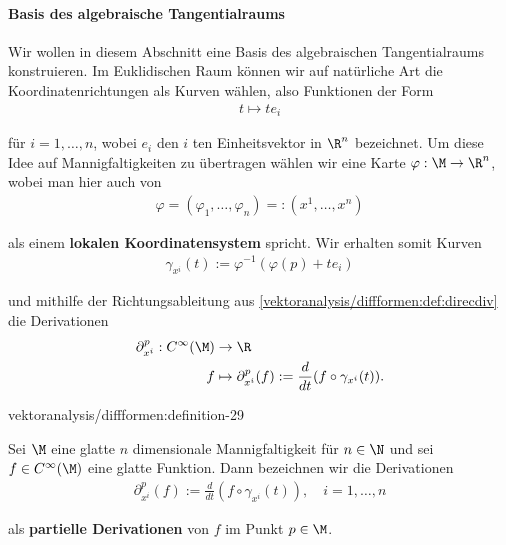 \documentclass[letterpaper,10pt,english]{jupyterBook}
\begin{document}
\paragraph{Basis des algebraische Tangentialraums}
\label{\detokenize{vektoranalysis/diffformen:basis-des-algebraische-tangentialraums}}\label{\detokenize{vektoranalysis/diffformen:sec-tpbasis}}
\par
Wir wollen in diesem Abschnitt eine Basis des algebraischen Tangentialraums konstruieren.
Im Euklidischen Raum können wir auf natürliche Art die Koordinatenrichtungen als Kurven wählen, also Funktionen der Form
\begin{align*}
t \mapsto t e_i
\end{align*}
\par
für \(i=1,\ldots,n\), wobei \(e_i\) den \(i\) ten Einheitsvektor in \(\R^n\) bezeichnet.
Um diese Idee auf Mannigfaltigkeiten zu übertragen wählen wir eine Karte \(\varphi:\M\to\R^n\), wobei man hier auch von
\begin{align*}
\varphi = (\varphi_1,\ldots,\varphi_n) =: (x^1,\ldots,x^n)
\end{align*}
\par
als einem \textbf{lokalen Koordinatensystem} spricht.
Wir erhalten somit Kurven
\begin{align*}
\gamma_{x^i}(t):= \varphi^{-1}(\varphi(p) + t e_i)
\end{align*}
\par
und mithilfe der Richtungsableitung aus \cref{vektoranalysis/diffformen:def:direcdiv} die Derivationen
\begin{align*}
\partial_{x^i}^p: C^\infty(\M) &\to \R\\
f &\mapsto \partial_{x^i}^p(f) := \frac{d}{dt} (f\circ \gamma_{x^i}(t)).
\end{align*}\begin{definition}{}{vektoranalysis/diffformen:definition-29}



\par
Sei \(\M\) eine glatte \(n\) dimensionale Mannigfaltigkeit für \(n\in\N\) und sei \(f \in C^\infty(\M)\) eine glatte Funktion.
Dann bezeichnen wir die Derivationen
\begin{align*}
\partial_{x^i}^p (f) := \frac{d}{dt} (f\circ \gamma_{x^i}(t)), \quad i=1,\ldots,n
\end{align*}
\par
als \textbf{partielle Derivationen} von \(f\) im Punkt \(p \in \M\).
\end{definition}
\end{document}
